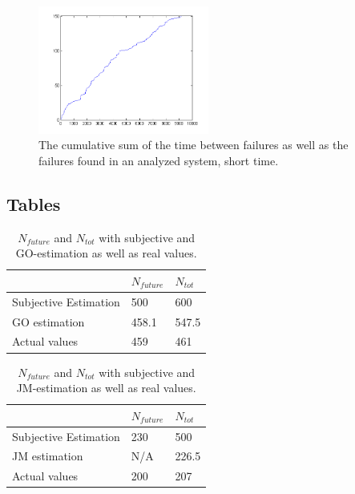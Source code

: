 \begin{figure}[htb!]
\begin{center}
	\includegraphics[width=0.5\textwidth]{cumsumjmdata1plot.png}
\caption{The cumulative sum of the time between failures as well as the failures found in an analyzed system, short time.}
\end{center}
\label{cumulativejmdata1}
\end{figure}

\clearpage
\subsection*{Tables}

\begin{table}[!htb]
	\centering
	\caption{$N_{future}$ and $N_{tot}$ with subjective and GO-estimation as well as real values.}
	\label{goelokumototable}	
    \begin{tabular}{|l|l|l|}
        \hline
        ~ & $N_{future}$ & $N_{tot}$ \\ \hline
        Subjective Estimation            & 500   & 600 		\\ 
        GO estimation                    & 458.1 & 547.5	\\ 
        Actual values                    & 459 	 & 461		\\ 
        \hline
    \end{tabular}
\end{table}

\begin{table}[!htb]
	\centering
	\caption{$N_{future}$ and $N_{tot}$ with subjective and JM-estimation as well as real values.}
	\label{jelinskimorandatable}	
    \begin{tabular}{|l|l|l|}
        \hline
        ~ & $N_{future}$ & $N_{tot}$ \\ \hline
        Subjective Estimation            & 230   & 500 		\\ 
        JM estimation                    & N/A   & 226.5	\\ 
        Actual values                    & 200 	 & 207		\\ 
        \hline
    \end{tabular}
\end{table}